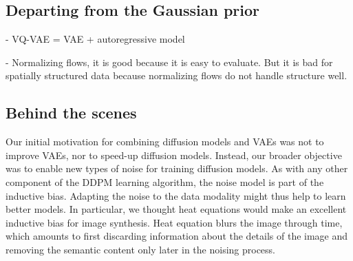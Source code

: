%


\subsection{Departing from the Gaussian prior}
- VQ-VAE = VAE + autoregressive model

- Normalizing flows, it is good because it is easy to evaluate. But it is bad for spatially structured data because normalizing flows do not handle structure well.

\subsection{Behind the scenes}
Our initial motivation for combining diffusion models and VAEs was not to improve VAEs, nor to speed-up diffusion models. Instead, our broader objective was to enable new types of noise for training diffusion models. As with any other component of the DDPM learning algorithm, the noise model is part of the inductive bias. Adapting the noise to the data modality might thus help to learn better models. In particular, we thought heat equations would make an excellent inductive bias for image synthesis. Heat equation blurs the image through time, which amounts to first discarding information about the details of the image and removing the semantic content only later in the noising process.

